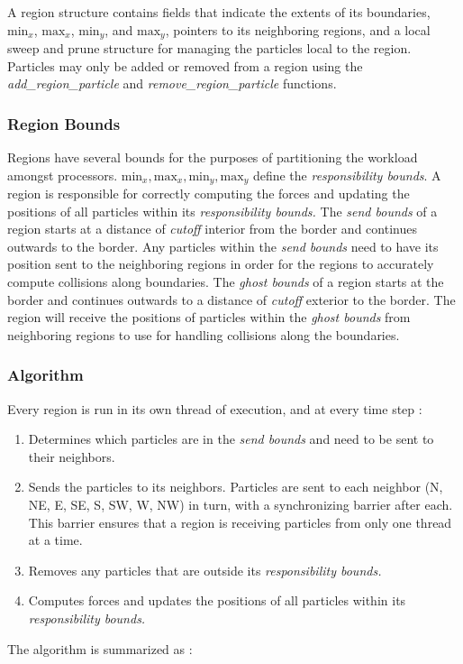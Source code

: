 \documentclass[11pt]{article} %
\begin{document}
A region structure contains fields that indicate the extents of its
boundaries, $\text{min}_{x}$, $\text{max}_{x}$, $\text{min}_{y}$, and $\text{max}_{y}$,
pointers to its neighboring regions, and a local sweep and prune
structure for managing the particles local to the region. Particles
may only be added or removed from a region using the \emph{add\_region\_particle
}and \emph{remove\_region\_particle} functions.


\subsubsection{Region Bounds}

Regions have several bounds for the purposes of partitioning the workload
amongst processors. $\text{min}_{x},\text{max}_{x},\text{min}_{y},\text{max}_{y}$
define the \emph{responsibility bounds}. A region is responsible for
correctly computing the forces and updating the positions of all particles
within its \emph{responsibility bounds.} The \emph{send bounds }of
a region starts at a distance of \emph{cutoff }interior from the border
and continues outwards to the border. Any particles within the \emph{send bounds
}need to have its position sent to the neighboring regions in order
for the regions to accurately compute collisions along boundaries.
The \emph{ghost bounds }of a region starts at the border and continues outwards
to a distance of \emph{cutoff }exterior to the border. The region
will receive the positions of particles within the \emph{ghost bounds}
from neighboring regions to use for handling collisions along the
boundaries.


\subsubsection{Algorithm}

Every region is run in its own thread of execution, and at every time
step :
\begin{enumerate}
\item Determines which particles are in the \emph{send bounds} and need
to be sent to their neighbors.
\item Sends the particles to its neighbors. Particles are sent to each
neighbor (N, NE, E, SE, S, SW, W, NW) in turn, with a synchronizing
barrier after each. This barrier ensures that a region is receiving particles
from only one thread at a time.
\item Removes any particles that are outside its \emph{responsibility bounds.}
\item Computes forces and updates the positions of all particles within
its \emph{responsibility bounds.}
\end{enumerate}
The algorithm is summarized as :
\end{document}
